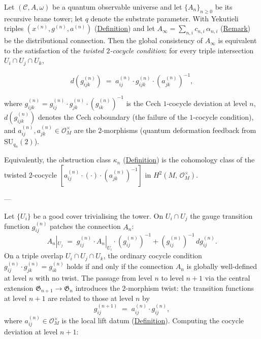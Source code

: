 \begin{proposition}
  \label{prop:descent-condition}
Let $(\mathcal{C}, A, \omega)$ be a quantum observable universe and let
$\{A_n\}_{n \geq 0}$ be its recursive brane tower; let $q$ denote the substrate parameter.  With Yekutieli
triples $(x^{(n)}, g^{(n)}, a^{(n)})$
(\hyperref[def:yekutieli-triple]{Definition}) and let
$A_\infty = \sum_{n,i} c_{n,i}\, \alpha_{n,i}$
(\hyperref[rem:distributional-connection]{Remark}) be the distributional
connection.  Then the global consistency of $A_\infty$ is equivalent to
the satisfaction of the \emph{twisted $2$-cocycle condition}: for every
triple intersection $U_i \cap U_j \cap U_k$,

\begin{equation}\label{eq:twisted-2-cocycle}
  d\!\left(g_{ijk}^{(n)}\right)
  \;=\;
  a_{ij}^{(n)} \cdot g_{ijk}^{(n)} \cdot \left(a_{jk}^{(n)}\right)^{-1},
\end{equation}

where
$g_{ijk}^{(n)} = g_{ij}^{(n)} \cdot g_{jk}^{(n)} \cdot (g_{ik}^{(n)})^{-1}$
is the Cech $1$-cocycle deviation at level $n$,
$d(g_{ijk}^{(n)})$ denotes the Cech coboundary
(the failure of the $1$-cocycle condition), and
$a_{ij}^{(n)}, a_{jk}^{(n)} \in \mathcal{O}_M^{\times}$ are the
$2$-morphisms (quantum deformation feedback from $\mathrm{SU}_{q_n}(2)$).

Equivalently, the obstruction class $\kappa_n$
(\hyperref[def:quantum-characteristic-classes]{Definition}) is the cohomology
class of the twisted $2$-cocycle
$[a_{ij}^{(n)} \cdot (\cdot) \cdot (a_{jk}^{(n)})^{-1}]$ in
$H^2(M,\, \mathcal{O}_M^{\times})$.

---

Let $\{U_i\}$ be a good cover trivialising the tower.  On
$U_i \cap U_j$ the gauge transition function $g_{ij}^{(n)}$ patches
the connection $A_n$:
\[
A_n|_{U_j} \;=\; g_{ij}^{(n)} \cdot A_n|_{U_i} \cdot
  (g_{ij}^{(n)})^{-1} + (g_{ij}^{(n)})^{-1}\, dg_{ij}^{(n)}.
\]
On a triple overlap $U_i \cap U_j \cap U_k$, the ordinary cocycle
condition $g_{ij}^{(n)} \cdot g_{jk}^{(n)} = g_{ik}^{(n)}$ holds if and
only if the connection $A_n$ is globally well-defined at level $n$ with
no twist.  The passage from level $n$ to level $n{+}1$ via the central
extension $\mathfrak{G}_{n+1} \to \mathfrak{G}_n$ introduces the
$2$-morphism twist: the transition functions at level $n{+}1$ are related
to those at level $n$ by
\[
g_{ij}^{(n+1)} \;=\; a_{ij}^{(n)} \cdot g_{ij}^{(n)},
\]
where $a_{ij}^{(n)} \in \mathcal{O}_M^{\times}$ is the local lift datum
(\hyperref[def:yekutieli-triple]{Definition}).  Computing the cocycle deviation
at level $n{+}1$:


\end{proposition}
